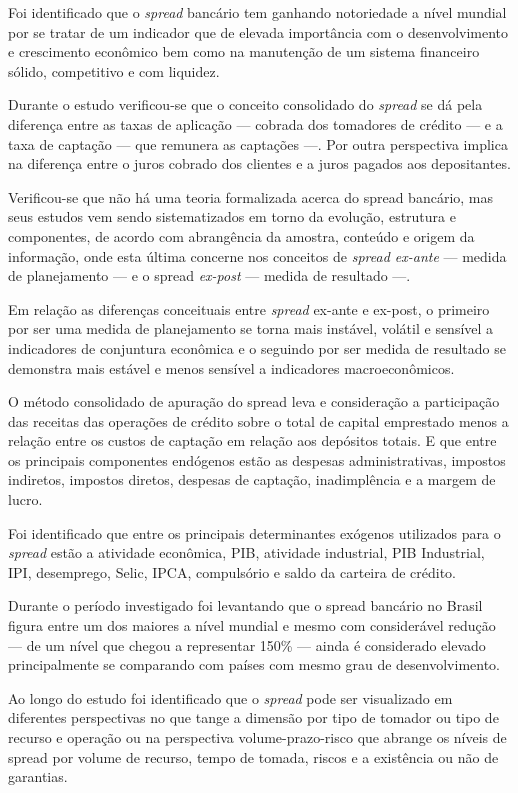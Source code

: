 \documentclass[
  12pt,
  12pt,
  openright,
  oneside,
  a4paper,
  chapter=TITLE,
  section=TITLE,
  subsection=TITLE,
  subsubsection=TITLE,
  english,
  portugues,
  sumario=tradicional]{abntex2}
\begin{document}
Foi identificado que o \emph{spread} bancário tem ganhando notoriedade a nível mundial por se tratar de um indicador que de elevada importância com o desenvolvimento e crescimento econômico bem como na manutenção de um sistema financeiro sólido, competitivo e com liquidez.

Durante o estudo verificou-se que o conceito consolidado do \emph{spread} se dá pela diferença entre as taxas de aplicação --- cobrada dos tomadores de crédito --- e a taxa de captação --- que remunera as captações ---. Por outra perspectiva implica na diferença entre o juros cobrado dos clientes e a juros pagados aos depositantes.

Verificou-se que não há uma teoria formalizada acerca do spread bancário, mas seus estudos vem sendo sistematizados em torno da evolução, estrutura e componentes, de acordo com abrangência da amostra, conteúdo e origem da informação, onde esta última concerne nos conceitos de \emph{spread ex-ante} --- medida de planejamento --- e o spread \emph{ex-post} --- medida de resultado ---.

Em relação as diferenças conceituais entre \emph{spread} ex-ante e ex-post, o primeiro por ser uma medida de planejamento se torna mais instável, volátil e sensível a indicadores de conjuntura econômica e o seguindo por ser medida de resultado se demonstra mais estável e menos sensível a indicadores macroeconômicos.

O método consolidado de apuração do spread leva e consideração a participação das receitas das operações de crédito sobre o total de capital emprestado menos a relação entre os custos de captação em relação aos depósitos totais. E que entre os principais componentes endógenos estão as despesas administrativas, impostos indiretos, impostos diretos, despesas de captação, inadimplência e a margem de lucro.

Foi identificado que entre os principais determinantes exógenos utilizados para o \emph{spread} estão a atividade econômica, PIB, atividade industrial, PIB Industrial, IPI, desemprego, Selic, IPCA, compulsório e saldo da carteira de crédito.

Durante o período investigado foi levantando que o spread bancário no Brasil figura entre um dos maiores a nível mundial e mesmo com considerável redução --- de um nível que chegou a representar 150\% --- ainda é considerado elevado principalmente se comparando com países com mesmo grau de desenvolvimento.

Ao longo do estudo foi identificado que o \emph{spread} pode ser visualizado em diferentes perspectivas no que tange a dimensão por tipo de tomador ou tipo de recurso e operação ou na perspectiva volume-prazo-risco que abrange os níveis de spread por volume de recurso, tempo de tomada, riscos e a existência ou não de garantias.
\end{document}
